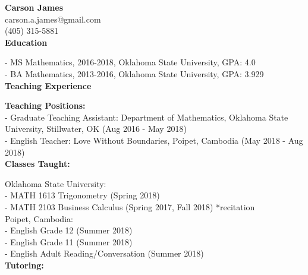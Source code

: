 \documentclass[12pt]{amsart}
\newcommand{\n}{\noindent}
\begin{document}
\textbf{\hspace{7cm}\large Carson James}\\ \phantom{1} \hspace{6.2cm} carson.a.james@gmail.com\\ \phantom{1} \hspace{7.4cm} (405) 315-5881 \vspace{1mm}\\


\n\textbf{\large Education} \vspace{4mm}

\n - MS Mathematics, 2016-2018, Oklahoma State University, GPA: 4.0 \vspace{2mm}\\
\n - BA Mathematics, 2013-2016, Oklahoma State University, GPA: 3.929 \vspace{.5mm}\\

 \n \textbf{\large Teaching Experience} \vspace{4mm}

\n \textbf{Teaching Positions:}\\ 
- Graduate Teaching Assistant: Department of Mathematics, Oklahoma State University, Stillwater, OK (Aug 2016 - May 2018) \vspace{2mm}\\ 
- English Teacher: Love Without Boundaries, Poipet, Cambodia (May 2018 - Aug 2018)\\

\n \textbf{Classes Taught:} \vspace{2mm}

\n Oklahoma State University: \vspace{1mm}\\
\n - MATH 1613 \hspace{4mm} Trigonometry (Spring 2018)\\
\n - MATH 2103 \hspace{4mm} Business Calculus (Spring 2017, Fall 2018) *recitation\vspace{2mm}\\
\n Poipet, Cambodia: \vspace{1mm}\\
\n - English Grade 12 (Summer 2018)\\
\n - English Grade 11 (Summer 2018)\\
\n - English Adult Reading/Conversation (Summer 2018)\\

\n \textbf{Tutoring:} \vspace{2mm}
\end{document}
